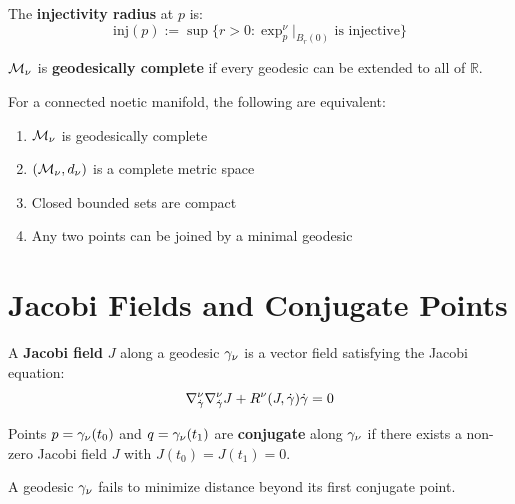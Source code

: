 \begin{definition}
\label{def:injectivity-radius}
The \textbf{injectivity radius} at $p$ is:
\[
    \mathrm{inj}(p) := \sup\{r > 0 : \exp_p^\nu|_{B_r(0)} \text{ is injective}\}
\]
\end{definition}

\begin{definition}
\label{def:geodesic-complete}
$\mathcal{M}_\nu$ is \textbf{geodesically complete} if every geodesic
can be extended to all of $\mathbb{R}$.
\end{definition}

\begin{theorem}
\label{thm:hopf-rinow}
For a connected noetic manifold, the following are equivalent:
\begin{enumerate}[label=(\roman*)]
    \item $\mathcal{M}_\nu$ is geodesically complete
    \item $(\mathcal{M}_\nu, d_\nu)$ is a complete metric space
    \item Closed bounded sets are compact
    \item Any two points can be joined by a minimal geodesic
\end{enumerate}
\end{theorem}

\section{Jacobi Fields and Conjugate Points}

\begin{definition}
\label{def:jacobi-field}
A \textbf{Jacobi field} $J$ along a geodesic $\gamma_\nu$ is a vector
field satisfying the Jacobi equation:
\[
    \nabla^\nu_{\dot{\gamma}} \nabla^\nu_{\dot{\gamma}} J
    + R^\nu(J, \dot{\gamma})\dot{\gamma} = 0
\]
\end{definition}

\begin{definition}
\label{def:conjugate-point}
Points $p = \gamma_\nu(t_0)$ and $q = \gamma_\nu(t_1)$ are
\textbf{conjugate} along $\gamma_\nu$ if there exists a non-zero
Jacobi field $J$ with $J(t_0) = J(t_1) = 0$.
\end{definition}

\begin{theorem}
\label{thm:conjugate-minimal}
A geodesic $\gamma_\nu$ fails to minimize distance beyond its first
conjugate point.
\end{theorem}

